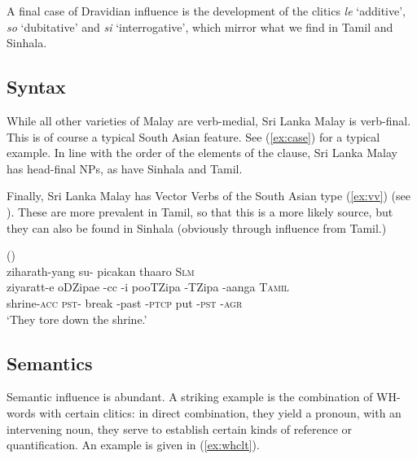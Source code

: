 \documentclass{article}
\renewcommand{\tz}{TZipa}
\renewcommand{\dz}{DZipa}
\renewcommand{\xref}[1]{(\ref{#1})}
\renewcommand{\ea}{()\\}
\renewcommand{\trs}[2]{{\em #1\em} `#2'}
\begin{document}
A final case of Dravidian influence is the development of the clitics \trs{le}{additive}, \trs{so}{dubitative} and \trs{si}{interrogative}, which mirror what we find in Tamil and Sinhala. 



\subsection{Syntax}
While all other varieties of Malay are verb-medial, Sri Lanka Malay is verb-final. This is of course a typical South Asian feature. See \xref{ex:case} for a typical example. In line with the order of the elements of the clause, Sri Lanka Malay has head-final NPs, as have Sinhala and Tamil.

Finally, Sri Lanka Malay has Vector Verbs of the South Asian type \xref{ex:vv} (see \citet{Nordhoff2012svc}). These are more prevalent in Tamil, so that this is a more likely source, but they can also be found in Sinhala (obviously through influence from Tamil.)


\ea \label{ex:vv}
\glll ziharath-yang 	su- picakan {} {}    	thaaro {} {}		\textsc{Slm} \\
	ziyaratt-e   	{}	o{\dz}e -cc    -i 	poo{\tz} 	-{\tz} -aanga 	\textsc{Tamil} \\ 
	shrine-\textsc{acc} 	\textsc{pst}- break -past -\textsc{ptcp} 	put 	-\textsc{pst} -\textsc{agr} \\
	`They tore down the shrine.' \citep[171]{SmithEtAl2006cll}
\z

\subsection{Semantics}
Semantic influence is abundant. A striking example is the combination of WH-words with certain clitics: in direct combination, they yield a pronoun, with an intervening noun, they serve to establish certain kinds of reference or quantification. An example is given in \xref{ex:whclt}.

%  
 
\end{document}
